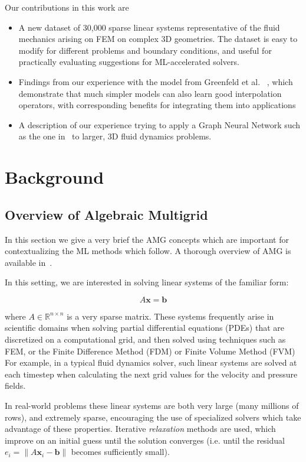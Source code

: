\documentclass{svproc}
\newcommand{\etal}{et al. }
\begin{document}
Our contributions in this work are
\begin{itemize}
    \item A new dataset of 30,000 sparse linear systems representative of
    the fluid mechanics arising on FEM on complex 3D geometries. The dataset is easy to modify for different problems and boundary conditions, and useful for practically evaluating suggestions for ML-accelerated solvers.
    \item Findings from our experience with the model from Greenfeld \etal~\cite{Greenfeld2019}, which demonstrate that much simpler models can also learn good interpolation operators, with corresponding benefits for integrating them into applications 
    \item A description of our experience trying to apply a Graph Neural Network such as the one in~\cite{Luz2020} to larger, 3D fluid dynamics problems.
    
\end{itemize}


\section{Background}
\subsection{Overview of Algebraic Multigrid}
\label{sec:amg}
In this section we give a very brief the AMG concepts which are important for contextualizing the ML methods which follow. A thorough overview of AMG is available in~\cite{STUBEN2001281}.

In this setting, we are interested in solving linear systems of the familiar form:

\begin{equation}
A\mathbf{x} = \mathbf{b}
\end{equation}

where $A \in \mathbb{R}^{n\times n}$ is a very sparse matrix. These systems frequently arise in scientific domains when solving partial differential equations (PDEs) that are discretized on a computational grid, and then solved using techniques such as FEM, or the Finite Difference Method (FDM) or Finite Volume Method (FVM) For example, in a typical fluid dynamics solver, such linear systems are solved at each timestep when calculating the next grid values for the velocity and pressure fields.

In real-world problems these linear systems are both very large (many millions of rows), and extremely sparse, encouraging the use of specialized solvers which take advantage of these properties. Iterative \textit{relaxation} methods are used, which improve on an initial guess until the solution converges (i.e. until the residual $e_i = \| A\mathbf{x}_i - \mathbf{b}\|$ becomes sufficiently small).
\end{document}
